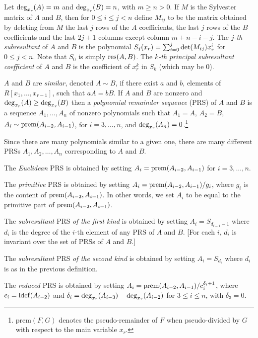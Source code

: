 Let ${\rm deg}_{x_r}(A) = m$ and ${\rm deg}_{x_r}(B) = n$, with $m
\geq n >0$. If $M$ is the Sylvester matrix of $A$ and $B$, then for 
$0 \leq i \leq j < n$ define $M_{ij}$ to be the matrix obtained by
deleting from $M$ the last $j$ rows of the $A$ coefficients, the last
$j$ rows of the $B$ coefficients and the last $2j+1$ columns except
column $m+n-i-j$.  The {\em $j$-th subresultant} of $A$ and $B$ is the
polynomial $S_j(x_r) = \sum_{i=0}^{j}{\rm det}(M_{ij})x_r^i$ for $0
\leq j < n$.  Note that $S_0$ is simply ${\rm res}(A,B)$.  The {\em
$k$-th principal subresultant coefficient} of $A$ and $B$ is the
coefficient of $x_r^k$ in $S_k$ (which may be 0).

$A$ and $B$ are {\em similar}, denoted $A \sim B$, if there exist $a$
and $b$, elements of $R[x_1,\ldots,x_{r-1}]$, such that $aA = bB$.
%
If $A$ and $B$ are nonzero and ${\rm deg}_{x_r}(A) \geq {\rm
deg}_{x_r}(B)$ then a {\em polynomial remainder sequence} (PRS) of $A$
and $B$ is a sequence $A_1, \ldots, A_n$ of nonzero polynomials such
that $A_1 = A$, $A_2 = B$, $A_i \sim {\rm prem}(A_{i-2},A_{i-1})$, for
$i = 3,\ldots,n$, and ${\rm deg}_{x_r}(A_n) = 0$.\footnote{prem$(F,G)$
denotes the pseudo-remainder of $F$ when pseudo-divided by $G$ with
respect to the main variable $x_r$.} 

Since there are many polynomials similar to a given one, there are
many different PRSs $A_1, A_2, \ldots, A_n$ corresponding to $A$ and $B$.

The {\em Euclidean} PRS is obtained by setting $A_i = {\rm
prem}(A_{i-2},A_{i-1})$ for $i = 3,\ldots,n$.

The {\em primitive} PRS is obtained by setting $A_i = {\rm
prem}(A_{i-2}, A_{i-1})/g_i$, where $g_i$ is the content of ${\rm
prem}(A_{i-2}, A_{i-1})$. In other words, we set $A_i$ to be equal to
the primitive part of ${\rm prem}(A_{i-2}, A_{i-1})$.

The {\em subresultant} PRS {\em of the first kind} is obtained by
setting $A_i = S_{d_{i-1}-1}$ where $d_i$ is the degree of the $i$-th
element of any PRS of $A$ and $B$. [For each $i$, $d_i$ is invariant
over the set of PRSs of $A$ and $B$.]

The {\em subresultant} PRS {\em of the second kind} is obtained by
setting $A_i = S_{d_i}$ where $d_i$ is as in the previous definition.

The {\em reduced} PRS is obtained by setting $A_i = {\rm
prem}(A_{i-2}, A_{i-1}) / c_i^{\delta_i+1}$, where $c_i = {\rm
ldcf}(A_{i-2})$ and $\delta_i = {\rm deg}_{x_r}(A_{i-3})-{\rm
deg}_{x_r}(A_{i-2})$ for $3 \leq i \leq n$, with  $\delta_3 = 0$.

